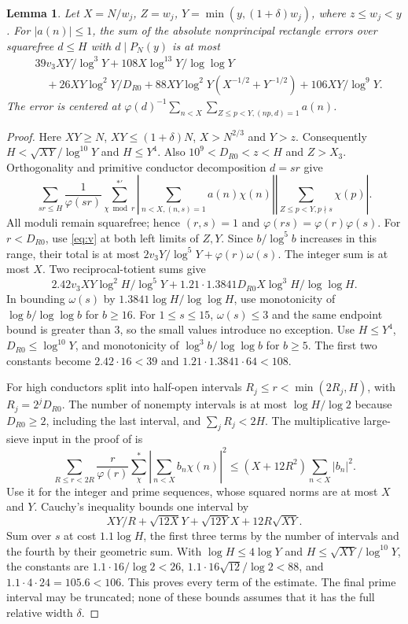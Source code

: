 \documentclass[11pt]{article}
\newtheorem{lemma}[theorem]{Lemma}
\theoremstyle{remark}\newtheorem{remark}[theorem]{Remark}
\begin{document}
\begin{lemma}\label{lem:rectangle}
Let $X=N/w_j$, $Z=w_j$, $Y=\min(y,(1+\delta)w_j)$, where $z\le w_j<y$.
For $|a(n)|\le1$, the sum of the absolute nonprincipal rectangle errors
over squarefree $d\le H$ with $d\mid P_N(y)$ is at most
\begin{align*}
&39v_3XY/\log^3Y+108X\log^{13}Y/\log\log Y\\
&\quad+26XY\log^2Y/D_{R0}
+88XY\log^2Y(X^{-1/2}+Y^{-1/2})+106XY/\log^9Y.
\end{align*}
The error is centered at
$\varphi(d)^{-1}\sum_{n<X}\sum_{Z\le p<Y,(np,d)=1}a(n)$.
\end{lemma}
\begin{proof}
Here $XY\ge N$, $XY\le(1+\delta)N$, $X>N^{2/3}$ and $Y>z$.
Consequently $H<\sqrt{XY}/\log^{10}Y$ and $H\le Y^4$.
Also $10^9<D_{R0}<z<H$ and $Z>X_3$.
Orthogonality and primitive conductor decomposition $d=sr$ give
\[
\sum_{sr\le H}\frac1{\varphi(sr)}\sum_{\chi\bmod r}^{*\prime}
\left|\sum_{n<X,(n,s)=1}a(n)\chi(n)\right|
\left|\sum_{Z\le p<Y,p\nmid s}\chi(p)\right|.
\]
All moduli remain squarefree; hence $(r,s)=1$ and
$\varphi(rs)=\varphi(r)\varphi(s)$.
For $r<D_{R0}$, use \eqref{eq:v} at both left limits of $Z,Y$.
Since $b/\log^5b$ increases in this range, their total is at most
$2v_3Y/\log^5Y+\varphi(r)\omega(s)$.
The integer sum is at most $X$. Two reciprocal-totient sums give
\[
2.42v_3XY\log^2H/\log^5Y
+1.21\cdot1.3841D_{R0}X\log^3H/\log\log H.
\]
In bounding $\omega(s)$ by $1.3841\log H/\log\log H$, use
monotonicity of $\log b/\log\log b$ for $b\ge16$.
For $1\le s\le15$, $\omega(s)\le3$ and the same endpoint bound
is greater than $3$, so the small values introduce no exception.
Use $H\le Y^4$, $D_{R0}\le\log^{10}Y$, and monotonicity of
$\log^3b/\log\log b$ for $b\ge5$.
The first two constants become $2.42\cdot16<39$ and
$1.21\cdot1.3841\cdot64<108$.

For high conductors split into half-open intervals
$R_j\le r<\min(2R_j,H)$, with $R_j=2^jD_{R0}$.
The number of nonempty intervals is at most $\log H/\log2$ because
$D_{R0}\ge2$, including the last interval, and $\sum_jR_j<2H$.
The multiplicative large-sieve input in the proof of
\cite[Lemma 32, source label \texttt{lemma:bf}]{BJS} is
\[
\sum_{R\le r<2R}\frac r{\varphi(r)}\sum_\chi^*
\left|\sum_{n<X}b_n\chi(n)\right|^2\le(X+12R^2)\sum_{n<X}|b_n|^2.
\]
Use it for the integer and prime sequences, whose squared norms are
at most $X$ and $Y$. Cauchy's inequality bounds one interval by
\[
XY/R+\sqrt{12X}Y+\sqrt{12Y}X+12R\sqrt{XY}.
\]
Sum over $s$ at cost $1.1\log H$, the first three terms by the number
of intervals and the fourth by their geometric sum. With $\log H\le4\log Y$
and $H\le\sqrt{XY}/\log^{10}Y$, the constants are
$1.1\cdot16/\log2<26$, $1.1\cdot16\sqrt{12}/\log2<88$, and
$1.1\cdot4\cdot24=105.6<106$. This proves every term of the estimate.
The final prime interval may be truncated; none of these bounds assumes
that it has the full relative width $\delta$.
\end{proof}
\end{document}
